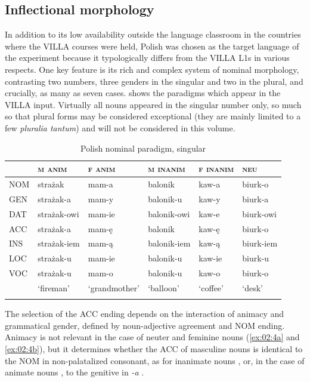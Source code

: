 \subsection{Inflectional morphology}\label{sec:02:2.1}

In addition to its low availability outside the language classroom in the countries where the VILLA courses were held, Polish was chosen as the target language of the experiment because it typologically differs from the VILLA L1s in various respects. One key feature is its rich and complex system of nominal morphology, contrasting two numbers, three genders in the singular and two in the plural, and crucially, as many as seven cases.  shows the paradigms which appear in the VILLA input. Virtually all nouns appeared in the singular number only, so much so that plural forms may be considered exceptional (they are mainly limited to a few \textit{pluralia tantum}) and will not be considered in this volume.

\begin{table}
    \begin{tabular}{llllll}
\lsptoprule
         & \textsc{m anim} & \textsc{f anim} & \textsc{m inanim} & \textsc{f inanim} & \textsc{neu}\\
\midrule
        NOM & strażak & mam-a & balonik & kaw-a & biurk-o\\
        GEN & strażak-a & mam-y & balonik-u & kaw-y & biurk-a\\
        DAT & strażak-owi & mam-ie & balonik-owi & kaw-e & biurk-owi\\
        ACC & strażak-a & mam-ę & balonik & kaw-ę & biurk-o\\
        INS & strażak-iem & mam-ą & balonik-iem & kaw-ą & biurk-iem\\
        LOC & strażak-u & mam-ie & balonik-u & kaw-ie & biurk-u\\
        VOC & strażak-u & mam-o & balonik-u & kaw-o & biurk-o\\
        & ‘fireman’ & ‘grandmother’ & ‘balloon’ & ‘coffee’ & ‘desk’\\
\lspbottomrule
    \end{tabular}
    \caption{Polish nominal paradigm, singular}
    \label{tab:02:3a}
\end{table}

The selection of the ACC ending depends on the interaction of animacy and grammatical gender, defined by noun-adjective agreement and NOM ending. Animacy is not relevant in the case of neuter and feminine nouns (\ref{ex:02:4a} and \ref{ex:02:4b}), but it determines whether the ACC of masculine nouns is identical to the NOM in non-palatalized consonant, as for inanimate nouns , or, in the case of animate nouns , to the genitive in \textit{-a} .

